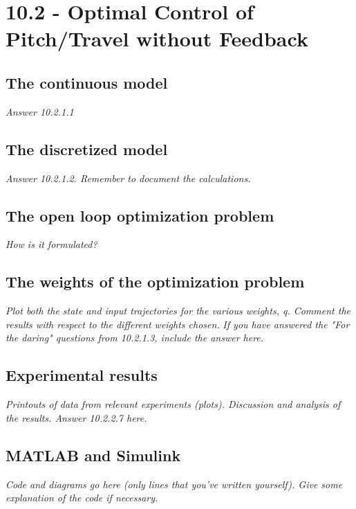 \section{10.2 - Optimal Control of Pitch/Travel without Feedback }

\subsection{The continuous model}
\textit{Answer 10.2.1.1}

\subsection{The discretized model}
\textit{Answer 10.2.1.2. Remember to document the calculations.}

\subsection{The open loop optimization problem}
\textit{How is it formulated?}

\subsection{The weights of the optimization problem}
\textit{Plot both the state and input trajectories for the various weights, q. Comment the results with respect to the different weights chosen.}
\textit{If you have answered the "For the daring" questions from 10.2.1.3, include the answer here.}

\subsection{Experimental results}
\textit{Printouts of data from relevant experiments (plots).
Discussion and analysis of the results.
Answer 10.2.2.7 here.}

\subsection{MATLAB and Simulink}
\textit{Code and diagrams go here (only lines that you've written yourself). Give some explanation of the code if necessary.}
	
	
	
	
	
	
	
	
	
	
	
	
	 
	
